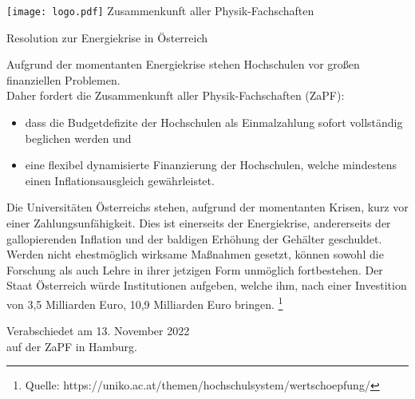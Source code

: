\documentclass[DIV=calc]{scrartcl}
\begin{document}
\hspace{0.87\textwidth}
\begin{minipage}{120pt}
	\vspace{-1.8cm}
	\texttt{[image: logo.pdf]}
	\centering
	\small Zusammenkunft aller Physik-Fachschaften
\end{minipage}

\begin{center}
  \huge{Resolution zur Energiekrise in Österreich}\vspace{.25\baselineskip}\\
  \normalsize
\end{center}
\vspace{1cm}

Aufgrund der momentanten Energiekrise stehen Hochschulen vor großen finanziellen Problemen.\\
Daher fordert die Zusammenkunft aller Physik-Fachschaften (ZaPF):
\begin{itemize}
\item dass die Budgetdefizite der Hochschulen als Einmalzahlung sofort vollständig beglichen werden und
\item eine flexibel dynamisierte Finanzierung der Hochschulen, welche mindestens einen Inflationsausgleich gewährleistet.
\end{itemize}
Die Universitäten Österreichs stehen, aufgrund der momentanten Krisen, kurz vor einer Zahlungsunfähigkeit. Dies ist einerseits der Energiekrise, andererseits der gallopierenden Inflation und der baldigen Erhöhung der Gehälter geschuldet. Werden nicht ehestmöglich wirksame Maßnahmen gesetzt, können sowohl die Forschung als auch Lehre in ihrer jetzigen Form unmöglich fortbestehen. Der Staat Österreich würde Institutionen aufgeben, welche ihm, nach einer Investition von 3,5 Milliarden Euro, 10,9 Milliarden Euro bringen. \footnote{Quelle: https://uniko.ac.at/themen/hochschulsystem/wertschoepfung/}
    
\vspace{1cm} 

\vfill
\begin{flushright}
	Verabschiedet am 13. November 2022 \\
	auf der ZaPF in Hamburg.
\end{flushright}
\end{document}
